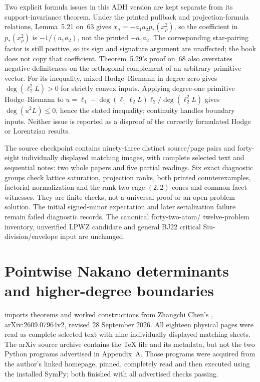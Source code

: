 Two explicit formula issues in this ADH version are kept
separate from its support-invariance theorem. Under the
printed pullback and projection-formula relations, Lemma~5.21
on~63 gives
$x_\sigma=-a_1a_2p_*(x_\rho^2)$, so the coefficient in
$p_*(x_\rho^2)$ is $-1/(a_1a_2)$, not the printed
$-a_1a_2$. The corresponding star-pairing factor is still
positive, so its sign and signature argument are unaffected;
the book does not copy that coefficient. Theorem~5.29's
proof on~68 also overstates negative definiteness on the
orthogonal complement of an arbitrary primitive vector.
For its inequality, mixed Hodge--Riemann in degree zero
gives $\deg(\ell_2^2L)>0$ for strictly convex inputs.
Applying degree-one primitive Hodge--Riemann to
$u=\ell_1-\deg(\ell_1\ell_2L)\ell_2/\deg(\ell_2^2L)$
gives $\deg(u^2L)\leq0$, hence the stated inequality;
continuity handles boundary inputs. Neither issue is
reported as a disproof of the correctly formulated Hodge
or Lorentzian results.

The source checkpoint contains ninety-three distinct
source/page pairs and forty-eight individually displayed
matching images, with complete selected text and sequential
notes: two whole papers and five partial readings.
Six exact diagnostic groups check lattice saturation,
projection ranks, both printed counterexamples, factorial
normalization and the rank-two cage $(2,2)$ cones and
common-facet witnesses. They are finite checks, not a
universal proof or an open-problem solution. The initial
signed-minor expectation and later serialization failure
remain failed diagnostic records. The canonical forty-two-atom/
twelve-problem inventory, unverified LPWZ candidate and
general BJ22 critical Siu-division/envelope input are unchanged.


\section{Pointwise Nakano determinants and higher-degree boundaries}
\label{sec:appL-Nakano-determinant-sources}

 imports theorems and
worked constructions from Zhangchi Chen's
\cite{Chen26NakanoDeterminantsV2}, arXiv:2609.07964v2,
revised 28 September 2026. All eighteen physical pages were
read as complete selected text with nine individually
displayed matching sheets. The arXiv source archive contains
the TeX file and its metadata, but not the two Python programs
advertised in Appendix~A. Those programs were acquired from
the author's linked homepage, pinned, completely read and
then executed using the installed SymPy; both finished with
all advertised checks passing.

